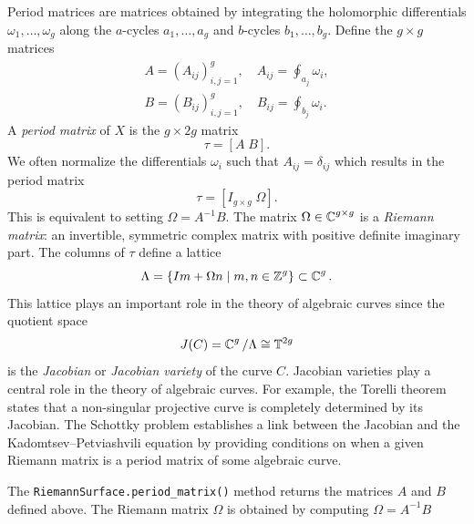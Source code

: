 Period matrices are matrices obtained by integrating the holomorphic
differentials $\omega_1, \ldots, \omega_g$ along the $a$-cycles $a_1,\ldots,a_g$
and $b$-cycles $b_1,\ldots,b_g$. Define the $g \times g$ matrices
\begin{align*}
  A = \left( A_{ij} \right)_{i,j=1}^g,
  \quad A_{ij} = \oint_{a_j} \omega_i, \\
  B = \left( B_{ij} \right)_{i,j=1}^g,
  \quad B_{ij} = \oint_{b_j} \omega_i.
\end{align*}
A {\it period matrix} of $X$ is the $g \times 2g$ matrix
\[
  \tau = \left[ A \; B \right].
\]
We often normalize the differentials $\omega_i$ such that $A_{ij} = \delta_{ij}$
which results in the period matrix
\begin{equation} \label{eqn: period-matrix}
  \tau = \left[ I_{g \times g} \; \Omega \right].
\end{equation}
This is equivalent to setting $\Omega = A^{-1}B$. The matrix $\Omega \in \operatorname{\mathbb{C}}^{g
  \times g}$ is a {\it Riemann matrix}: an invertible, symmetric complex matrix
with positive definite imaginary part. The columns of $\tau$ define a lattice
\[
  \Lambda = \{I m + \Omega n \; | \; m,n \in \operatorname{\mathbb{Z}}^g\} \subset \operatorname{\mathbb{C}}^g.
\]
This lattice plays an important role in the theory of algebraic curves since the
quotient space
\begin{equation} \label{eqn: jacobian}
  J(C) = \operatorname{\mathbb{C}}^g / \Lambda \cong \mathbb{T}^{2g}
\end{equation}
is the {\it Jacobian} or {\it Jacobian variety} of the curve $C$. Jacobian
varieties play a central role in the theory of algebraic curves. For example,
the Torelli theorem \cite{Mumford99} states that a non-singular projective curve
is completely determined by its Jacobian. The Schottky problem establishes a
link between the Jacobian and the Kadomtsev--Petviashvili equation by providing
conditions on when a given Riemann matrix is a period matrix of some algebraic
curve.


The \verb=RiemannSurface.period_matrix()= method returns the matrices $A$ and
$B$ defined above. The Riemann matrix $\Omega$ is obtained by computing $\Omega
= A^{-1}B$

